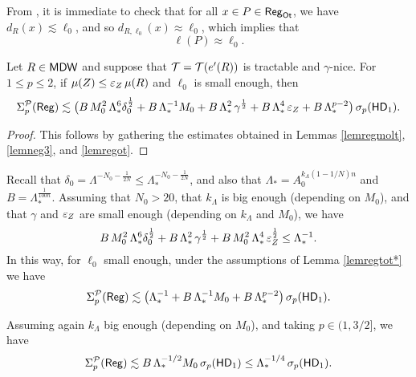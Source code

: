 \vv
\begin{rem}\label{remregot}
From , it is immediate to check that for all $x\in P\in{\mathsf{Reg}}_{\mathsf{Ot}}$, we have $d_R(x)\lesssim\ell_0$, and so $d_{R,\ell_0}(x)\approx \ell_0$, which implies that
$$\ell(P)\approx \ell_0.$$
\end{rem}

\vv

\begin{lemma}\label{lemregtot*}
Let $R\in{\mathsf{MDW}}$ and suppose that ${\mathcal T}={\mathcal T}(e'(R))$ is tractable and $\gamma$-nice.
For $1\leq p\leq2$,  if $\mu(Z)\leq {\varepsilon}_Z\,\mu(R)$ and $\ell_0$ is small enough, then
\begin{equation}\label{eqlemtot*}
\Sigma_p^{\mathcal P}({\mathsf{Reg}}) \lesssim \big(B\,M_0^2\,\Lambda_*^6 \delta_0^{\frac12}+ B\,\Lambda_*^{-1}M_0+ B\,\Lambda_*^2\,\gamma^{\frac12} + B\,\Lambda_*^4\,{\varepsilon}_Z + B\,\Lambda_*^{p-2}\big)
\,\sigma_p({\mathsf{HD}}_1).
\end{equation}
\end{lemma}

\begin{proof}
This follows by gathering the estimates obtained in Lemmas \ref{lemregmolt},
\ref{lemneg3}, and \ref{lemregot}.
\end{proof}

\vv



\begin{rem}\label{rem9.12}
Recall that $\delta_0 = \Lambda^{-N_0 - \frac1{2N}}\le \Lambda_*^{-N_0 - \frac1{2N}}$, and also that $\Lambda_* = A_0^{k_{\Lambda} (1-1/N) n}$ and $B = \Lambda_*^{\frac{1}{100n}}$. Assuming that $N_0>20$, that $k_{\Lambda}$ is big enough (depending on $M_0$), and that $\gamma$ and ${\varepsilon}_Z$ are small enough (depending on $k_\Lambda$ and $M_0$), we have
$$B\,M_0^2\,\Lambda_*^6 \delta_0^{\frac12}+  B\,\Lambda_*^2\,\gamma^{\frac12} + B\, M_0^2\, \Lambda_*^4\,
{\varepsilon}_Z^{\frac12} \leq \Lambda_*^{-1}.$$
In this way, for $\ell_0$ small enough, under the assumptions of Lemma \ref{lemregtot*} we have
$$\Sigma_p^{\mathcal P}({\mathsf{Reg}}) \lesssim \big(\Lambda_*^{-1}+ B\,\Lambda_*^{-1}M_0+ B\,\Lambda_*^{p-2}\big)
\,\sigma_p({\mathsf{HD}}_1).
$$

Assuming again $k_{\Lambda}$ big enough (depending on $M_0$), and taking $p\in(1,3/2]$, we have
\begin{equation}\label{eqregtot45}
\Sigma_p^{\mathcal P}({\mathsf{Reg}}) \lesssim  B\,\Lambda_*^{-1/2}M_0
\,\sigma_p({\mathsf{HD}}_1)\leq \Lambda_*^{-1/4}\,\sigma_p({\mathsf{HD}}_1).
\end{equation}
\end{rem}


